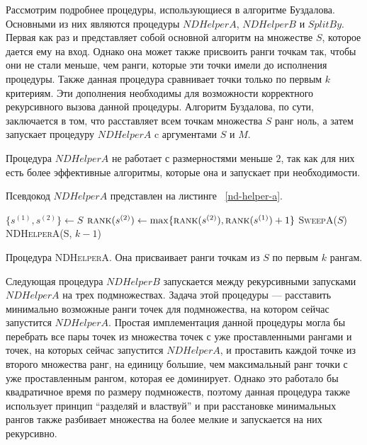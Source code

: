 Рассмотрим подробнее процедуры, использующиеся в алгоритме Буздалова. Основными из них являются процедуры $NDHelperA$, $NDHelperB$ и $SplitBy$. Первая как раз и представляет собой основной алгоритм на множестве $S$, которое дается ему на вход. Однако она может также присвоить ранги точкам так, чтобы они не стали меньше, чем ранги, которые эти точки имели до исполнения процедуры. Также данная процедура сравнивает точки только по первым $k$ критериям. Эти дополнения необходимы для возможности корректного рекурсивного вызова данной процедуры. Алгоритм Буздалова, по сути, заключается в том, что расставляет всем точкам множества $S$ ранг ноль, а затем запускает процедуру $NDHelperA$ c аргументами $S$ и $M$.

Процедура $NDHelperA$ не работает с размерностями меньше $2$, так как для них есть более эффективные алгоритмы, которые она и запускает при необходимости.

Псевдокод $NDHelperA$ представлен на листинге ~\ref{nd-helper-a}.

\begin{algorithm}
\begin{algorithmic}[1]
     \Return
        \State $\{s^{(1)}, s^{(2)}\} \gets S$
            \State $\textsc{rank}(s^{(2)}) \gets \max\{\textsc{rank}(s^{(2)}), \textsc{rank}(s^{(1)})+1\}$
        \EndIf
        \State \textsc{SweepA}($S$)
        \State \textsc{NDHelperA}(S, $k - 1$)
    \Else
    \EndIf
\EndProcedure
\end{algorithmic}
\caption{Процедура \textsc{NDHelperA}. Она присваивает ранги точкам из $S$ по первым $k$ рангам.}
\label{nd-helper-a}
\end{algorithm}

Следующая процедура $NDHelperB$ запускается между рекурсивными запусками $NDHelperA$ на трех подмножествах. Задача этой процедуры {---} расставить минимально возможные ранги точек для подмножества, на котором сейчас запустится $NDHelperA$. Простая имплементация данной процедуры могла бы перебрать все пары точек из множества точек с уже проставленными рангами и точек, на которых сейчас запустится $NDHelperA$, и проставить каждой точке из  второго множества ранг, на единицу большие, чем максимальный ранг точки с уже проставленным рангом, которая ее доминирует. Однако это работало бы квадратичное время по размеру подмножеств, поэтому данная процедура также использует принцип ``разделяй и властвуй'' и при расстановке минимальных рангов также разбивает множества на более мелкие и запускается на них рекурсивно.

